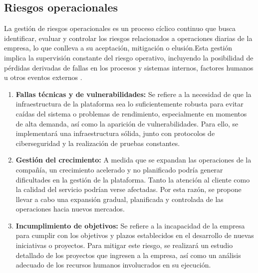 \subsection*{Riesgos operacionales}

La gestión de riesgos operacionales es un proceso cíclico continuo que busca identificar, evaluar y controlar los riesgos relacionados a operaciones diarias de la empresa, lo que conlleva a su aceptación, mitigación o elusión.Esta gestión implica la supervisión constante del riesgo operativo, incluyendo la posibilidad de pérdidas derivadas de fallas en los procesos y sistemas internos, factores humanos u otros eventos externos \parencite{Microbank01}.

\begin{enumerate}
	\item \textbf{Fallas técnicas y de vulnerabilidades:} Se refiere a la necesidad de que la infraestructura de la plataforma sea lo suficientemente robusta para evitar caídas del sistema o problemas de rendimiento, especialmente en momentos de alta demanda, así como la aparición de vulnerabilidades. Para ello, se implementará una infraestructura sólida, junto con protocolos de ciberseguridad y la realización de pruebas constantes.
	
	\item \textbf{Gestión del crecimiento:} A medida que se expandan las operaciones de la compañía, un crecimiento acelerado y no planificado podría generar dificultades en la gestión de la plataforma. Tanto la atención al cliente como la calidad del servicio podrían verse afectadas. Por esta razón, se propone llevar a cabo una expansión gradual, planificada y controlada de las operaciones hacia nuevos mercados.
	
	\item \textbf{Incumplimiento de objetivos:} Se refiere a la incapacidad de la empresa para cumplir con los objetivos y plazos establecidos en el desarrollo de nuevas iniciativas o proyectos. Para mitigar este riesgo, se realizará un estudio detallado de los proyectos que ingresen a la empresa, así como un análisis adecuado de los recursos humanos involucrados en su ejecución.
\end{enumerate}


